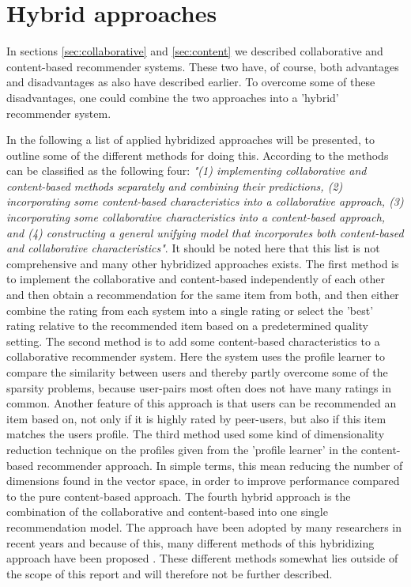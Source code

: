 \newpage
\section{Hybrid approaches}
\label{sec:hybrid}
In sections \ref{sec:collaborative} and \ref{sec:content} we described collaborative and content-based recommender systems. These two have, of course, both advantages and disadvantages as also have described earlier. To overcome some of these disadvantages, one could combine the two approaches into a 'hybrid' recommender system.\newline

In the following a list of applied hybridized approaches will be presented, to outline some of the different methods for doing this.
According to \citet[p. 20-22]{TowardsTheNextGenerationOfRs} the methods can be classified as the following four: \textit{"(1) implementing collaborative and content-based methods separately and combining their predictions, (2) incorporating some content-based characteristics into a collaborative approach, (3) incorporating some collaborative characteristics into a content-based approach, and (4) constructing a general unifying model that incorporates both content-based and collaborative characteristics"}. It should be noted here that this list is not comprehensive and many other hybridized approaches exists. \newline
The first method is to implement the collaborative and content-based independently of each other and then obtain a recommendation for the same item from both, and then either combine the rating from each system into a single rating or select the 'best' rating relative to the recommended item based on a predetermined quality setting. \newline
The second method is to add some content-based characteristics to a collaborative recommender system. Here the system uses the profile learner to compare the similarity between users and thereby partly overcome some of the sparsity problems, because user-pairs most often does not have many ratings in common. Another feature of this approach is that users can be recommended an item based on, not only if it is highly rated by peer-users, but also if this item matches the users profile. \newline
The third method used some kind of dimensionality reduction technique on the profiles given from the 'profile learner' in the content-based recommender approach. In simple terms, this mean reducing the number of dimensions found in the vector space, in order to improve performance compared to the pure content-based approach. \newline
The fourth hybrid approach is the combination of the collaborative and content-based into one single recommendation model. The approach have been adopted by many researchers in recent years and because of this, many different methods of this hybridizing approach have been proposed \citep[p. 22]{TowardsTheNextGenerationOfRs}. These different methods somewhat lies outside of the scope of this report and will therefore not be further described. \newline

